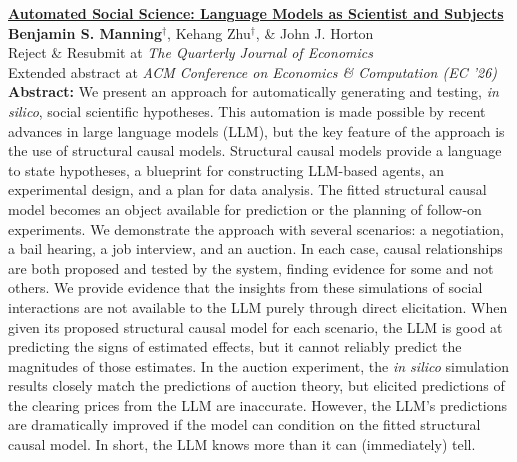 \documentclass[11pt]{article}
\newenvironment{publist}
  {\begin{list}{}{%
    \setlength{\leftmargin}{1.5em}%
    \setlength{\itemindent}{-1.5em}%
    \setlength{\itemsep}{10pt}%
    \setlength{\parsep}{0pt}%
    \setlength{\topsep}{4pt}}}
  {\end{list}}
\begin{document}
\begin{publist}
\item \href{https://www.nber.org/papers/w32381}{\textbf{Automated Social Science: Language Models as Scientist and Subjects}}\\
\textbf{Benjamin S. Manning}$^\dagger$, Kehang Zhu$^\dagger$, \& John J. Horton\\
Reject \& Resubmit at \textit{The Quarterly Journal of Economics}\\
Extended abstract at \textit{ACM Conference on Economics \& Computation (EC '26)}\\[3pt]
{\footnotesize \textbf{Abstract: }We present an approach for automatically generating and testing, \emph{in silico}, social scientific hypotheses.
This automation is made possible by recent advances in large language models (LLM), but the key feature of the approach is the use of structural causal models.
Structural causal models provide a language to state hypotheses, a blueprint for constructing LLM-based agents, an experimental design, and a plan for data analysis.
The fitted structural causal model becomes an object available for prediction or the planning of follow-on experiments.
We demonstrate the approach with several scenarios: a negotiation, a bail hearing, a job interview, and an auction.
In each case, causal relationships are both proposed and tested by the system, finding evidence for some and not others.
We provide evidence that the insights from these simulations of social interactions are not available to the LLM purely through direct elicitation.
When given its proposed structural causal model for each scenario, the LLM is good at predicting the signs of estimated effects, but it cannot reliably predict the magnitudes of those estimates.
In the auction experiment, the \emph{in silico} simulation results closely match the predictions of auction theory, but elicited predictions of the clearing prices from the LLM are inaccurate.
However, the LLM's predictions are dramatically improved if the model can condition on the fitted structural causal model.
In short, the LLM knows more than it can (immediately) tell.}


\end{publist}
\end{document}

